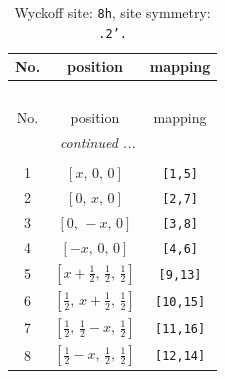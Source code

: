 \documentclass[fleqn,8pt]{jsarticle}
\begin{document}
\begin{longtable}{ccc}
\caption{Wyckoff site: {\tt 8h}, site symmetry: {\tt .2'.}}
 \\
 \hline \hline
No. & position & mapping \\ \hline \endfirsthead

\multicolumn{2}{l}{\tablename\ \thetable{}} \\
 \hline \hline
No. & position & mapping \\ \hline \endhead

 \hline \hline
\multicolumn{2}{r}{\footnotesize\it continued ...} \\ \endfoot

 \hline \hline
\multicolumn{2}{r}{} \\ \endlastfoot

1 & $\left[ x,\, 0,\, 0 \right]$ & {\tt [1,5]} \\ \hline
2 & $\left[ 0,\, x,\, 0 \right]$ & {\tt [2,7]} \\ \hline
3 & $\left[ 0,\, - x,\, 0 \right]$ & {\tt [3,8]} \\ \hline
4 & $\left[ - x,\, 0,\, 0 \right]$ & {\tt [4,6]} \\ \hline
5 & $\left[ x + \frac{1}{2},\, \frac{1}{2},\, \frac{1}{2} \right]$ & {\tt [9,13]} \\ \hline
6 & $\left[ \frac{1}{2},\, x + \frac{1}{2},\, \frac{1}{2} \right]$ & {\tt [10,15]} \\ \hline
7 & $\left[ \frac{1}{2},\, \frac{1}{2} - x,\, \frac{1}{2} \right]$ & {\tt [11,16]} \\ \hline
8 & $\left[ \frac{1}{2} - x,\, \frac{1}{2},\, \frac{1}{2} \right]$ & {\tt [12,14]} \\
\end{longtable}
\renewcommand{\arraystretch}{1.2}
\end{document}
